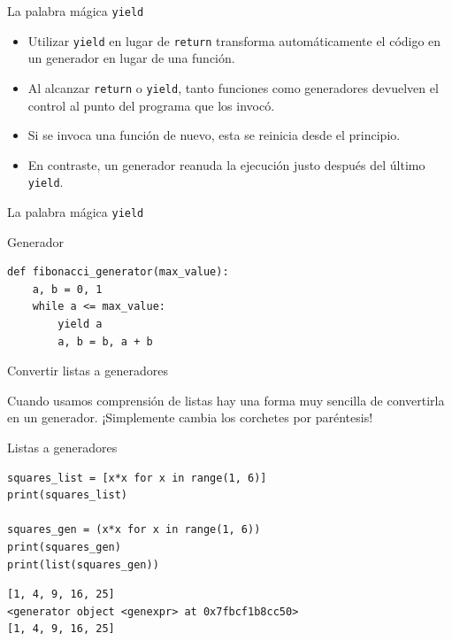 \documentclass[12pt]{beamer}
\begin{document}
\begin{frame}{La palabra mágica \texttt{yield}}
    \begin{itemize}
        \item Utilizar \texttt{yield} en lugar de \texttt{return} transforma automáticamente el código en un generador en lugar de una función.
        \item Al alcanzar \texttt{return} o \texttt{yield}, tanto funciones como generadores devuelven el control al punto del programa que los invocó.
        \item Si se invoca una función de nuevo, esta se reinicia desde el principio.
        \item En contraste, un generador reanuda la ejecución justo después del último \texttt{yield}.
    \end{itemize}
\end{frame}

\begin{frame}[fragile]{La palabra mágica \texttt{yield}}
\begin{block}{Generador}
\begin{verbatim}
def fibonacci_generator(max_value):
    a, b = 0, 1
    while a <= max_value:
        yield a
        a, b = b, a + b
\end{verbatim}
\end{block} 
\end{frame}

\begin{frame}[fragile]{Convertir listas a generadores}

\begin{center}
   Cuando usamos comprensión de listas hay una forma muy sencilla de convertirla en un generador. ¡Simplemente cambia los corchetes por paréntesis! 
\end{center}

\begin{block}{Listas a generadores}
\begin{verbatim}
squares_list = [x*x for x in range(1, 6)]
print(squares_list)

squares_gen = (x*x for x in range(1, 6))
print(squares_gen)
print(list(squares_gen))
\end{verbatim}

\begin{verbatim}
[1, 4, 9, 16, 25]
<generator object <genexpr> at 0x7fbcf1b8cc50>
[1, 4, 9, 16, 25]   
\end{verbatim}
\end{block} 
\end{frame}
\end{document}
